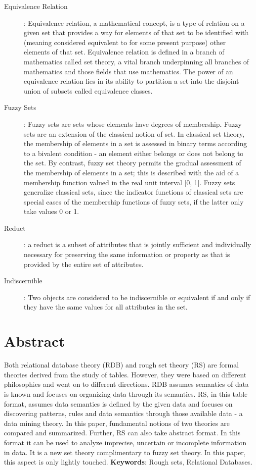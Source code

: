 \documentclass[12pt]{article}
\begin{document}
\begin{description}
\item [Equivalence Relation]: Equivalence relation, a mathematical concept, is a type of relation on a given set that provides a way for elements of that set to be identified with (meaning considered equivalent to for some present purpose) other elements of that set. Equivalence relation is defined in a branch of mathematics called set theory, a vital branch underpinning all branches of mathematics and those fields that use mathematics. The power of an equivalence relation lies in its ability to partition a set into the disjoint union of subsets called equivalence classes.
\item [Fuzzy Sets]: Fuzzy sets are sets whose elements have degrees of membership. Fuzzy sets are an extension of the classical notion of set. In classical set theory, the membership of elements in a set is assessed in binary terms according to a bivalent condition - an element either belongs or does not belong to the set. By contrast, fuzzy set theory permits the gradual assessment of the membership of elements in a set; this is described with the aid of a membership function valued in the real unit interval [0, 1]. Fuzzy sets generalize classical sets, since the indicator functions of classical sets are special cases of the membership functions of fuzzy sets, if the latter only take values 0 or 1.
\item[Reduct]: a reduct is a subset of attributes that is jointly sufficient and individually necessary for preserving the same information or property as that is provided by the entire set of attributes.
\item[Indiscernible]: Two objects are considered to be indiscernible or equivalent if and only if they have the same values for all attributes in the set.
\end{description}
\newpage

\section*{Abstract} Both relational database theory (RDB) and
rough set theory (RS) are formal theories derived from the
study of tables. However, they were based on different
philosophies and went on to different directions. RDB  assumes
semantics of data is known and focuses on organizing data
through its semantics. RS, in this table format, assumes data
semantics is defined by the given data and focuses on
discovering patterns, rules and data semantics through those
available data - a data mining theory. In this paper,
fundamental notions of two theories are compared and
summarized. Further, RS can also take abstract format. In this
format it can be used to analyze imprecise, uncertain or
incomplete information in data. It is a new set theory
complimentary to fuzzy set theory.  In this paper, this aspect
is only lightly touched.
\vskip 10pt
\textbf{Keywords}: Rough sets, Relational Databases.
\end{document}
